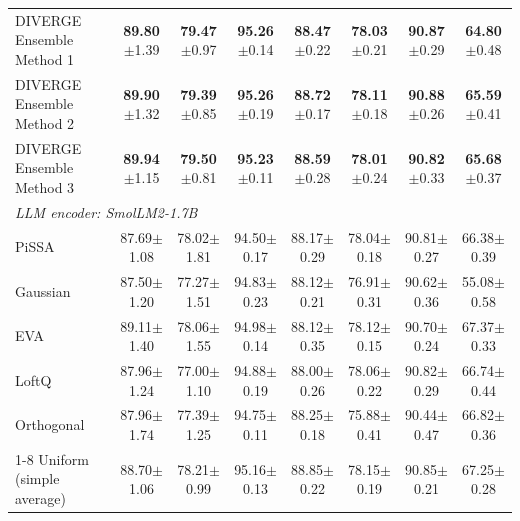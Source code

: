 \documentclass[a4paper,fleqn]{cas-sc}
\begin{document}
\begin{table}[htbp]
\begin{tabular*}{\textwidth}{@{\extracolsep{\fill}} lccccccc @{}}
DIVERGE Ensemble Method 1 & \textbf{89.80}{\scriptsize$\pm$1.39} & \textbf{79.47}{\scriptsize$\pm$0.97} & \textbf{95.26}{\scriptsize$\pm$0.14} & \textbf{88.47}{\scriptsize$\pm$0.22} & \textbf{78.03}{\scriptsize$\pm$0.21} & \textbf{90.87}{\scriptsize$\pm$0.29} & \textbf{64.80}{\scriptsize$\pm$0.48} \\
DIVERGE Ensemble Method 2 & \textbf{89.90}{\scriptsize$\pm$1.32} & \textbf{79.39}{\scriptsize$\pm$0.85} & \textbf{95.26}{\scriptsize$\pm$0.19} & \textbf{88.72}{\scriptsize$\pm$0.17} & \textbf{78.11}{\scriptsize$\pm$0.18} & \textbf{90.88}{\scriptsize$\pm$0.26} & \textbf{65.59}{\scriptsize$\pm$0.41} \\
DIVERGE Ensemble Method 3 & \textbf{89.94}{\scriptsize$\pm$1.15} & \textbf{79.50}{\scriptsize$\pm$0.81} & \textbf{95.23}{\scriptsize$\pm$0.11} & \textbf{88.59}{\scriptsize$\pm$0.28} & \textbf{78.01}{\scriptsize$\pm$0.24} & \textbf{90.82}{\scriptsize$\pm$0.33} & \textbf{65.68}{\scriptsize$\pm$0.37} \\
\midrule
\multicolumn{8}{l}{\textit{LLM encoder: SmolLM2-1.7B}} \\
\midrule
PiSSA                     & 87.69{\scriptsize$\pm$1.08} & 78.02{\scriptsize$\pm$1.81} & 94.50{\scriptsize$\pm$0.17} & 88.17{\scriptsize$\pm$0.29} & 78.04{\scriptsize$\pm$0.18} & 90.81{\scriptsize$\pm$0.27} & 66.38{\scriptsize$\pm$0.39} \\
Gaussian                  & 87.50{\scriptsize$\pm$1.20} & 77.27{\scriptsize$\pm$1.51} & 94.83{\scriptsize$\pm$0.23} & 88.12{\scriptsize$\pm$0.21} & 76.91{\scriptsize$\pm$0.31} & 90.62{\scriptsize$\pm$0.36} & 55.08{\scriptsize$\pm$0.58} \\
EVA                       & 89.11{\scriptsize$\pm$1.40} & 78.06{\scriptsize$\pm$1.55} & 94.98{\scriptsize$\pm$0.14} & 88.12{\scriptsize$\pm$0.35} & 78.12{\scriptsize$\pm$0.15} & 90.70{\scriptsize$\pm$0.24} & 67.37{\scriptsize$\pm$0.33} \\
LoftQ                     & 87.96{\scriptsize$\pm$1.24} & 77.00{\scriptsize$\pm$1.10} & 94.88{\scriptsize$\pm$0.19} & 88.00{\scriptsize$\pm$0.26} & 78.06{\scriptsize$\pm$0.22} & 90.82{\scriptsize$\pm$0.29} & 66.74{\scriptsize$\pm$0.44} \\
Orthogonal                & 87.96{\scriptsize$\pm$1.74} & 77.39{\scriptsize$\pm$1.25} & 94.75{\scriptsize$\pm$0.11} & 88.25{\scriptsize$\pm$0.18} & 75.88{\scriptsize$\pm$0.41} & 90.44{\scriptsize$\pm$0.47} & 66.82{\scriptsize$\pm$0.36} \\
\cmidrule(lr){1-8}
Uniform (simple average)  & 88.70{\scriptsize$\pm$1.06} & 78.21{\scriptsize$\pm$0.99} & 95.16{\scriptsize$\pm$0.13} & 88.85{\scriptsize$\pm$0.22} & 78.15{\scriptsize$\pm$0.19} & 90.85{\scriptsize$\pm$0.21} & 67.25{\scriptsize$\pm$0.28} \\

\end{tabular*}
\end{table}
\end{document}

